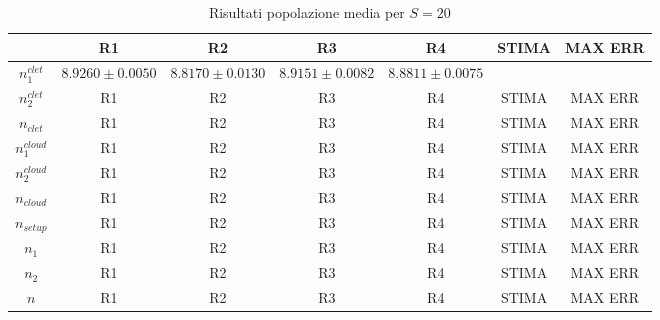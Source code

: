 \begin{table}[!h]
\begin{adjustbox}{width=\textwidth}
\begin{tabular}{c|c|c|c|c|c|c}
                & R1 & R2 & R3 & R4 & STIMA & MAX ERR \\
                \hline
$n_1^{clet}$  &$8.9260\pm0.0050$& $8.8170\pm0.0130$ & $8.9151\pm0.0082$ &
$8.8811\pm0.0075$ & & \\
$n_2^{clet}$  & R1 & R2 & R3 & R4 & STIMA & MAX ERR \\
$n_{clet}$    & R1 & R2 & R3 & R4 & STIMA & MAX ERR \\
$n_1^{cloud}$ & R1 & R2 & R3 & R4 & STIMA & MAX ERR \\
$n_2^{cloud}$ & R1 & R2 & R3 & R4 & STIMA & MAX ERR \\
$n_{cloud}$   & R1 & R2 & R3 & R4 & STIMA & MAX ERR \\
$n_{setup}$   & R1 & R2 & R3 & R4 & STIMA & MAX ERR \\
$n_1$         & R1 & R2 & R3 & R4 & STIMA & MAX ERR \\
$n_2$         & R1 & R2 & R3 & R4 & STIMA & MAX ERR \\
$n$           & R1 & R2 & R3 & R4 & STIMA & MAX ERR \\
\end{tabular}
\end{adjustbox}
\caption{Risultati popolazione media per $S=20$}
\label{pop_20}
\end{table}
